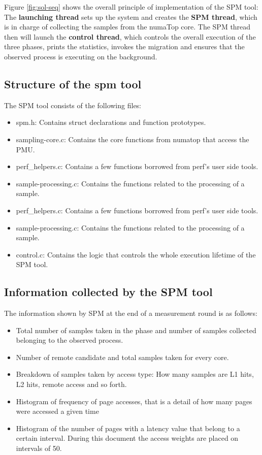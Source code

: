 Figure \ref{fig:sol-seq} shows the overall principle of implementation of the SPM tool: The \textbf{launching thread} sets up the system and creates the \textbf{SPM thread}, which is in charge of collecting the samples from the numaTop core. The SPM thread then will launch the \textbf{control thread}, which controls the overall execution of the three phases, prints the statistics, invokes the migration and ensures that the observed process is executing on the background.

\subsection{Structure of the spm tool}\label{subsection:spmstructr}

The SPM tool consists of the following files:
\begin{itemize}
	\item spm.h: Contains struct declarations and function prototypes.
	\item sampling-core.c: Contains the core functions from numatop that access the PMU.
		\item perf\_helpers.c: Contains a few functions borrowed from perf's user side tools.
	\item sample-processing.c: Contains the functions related to the processing of a sample.
	\item perf\_helpers.c: Contains a few functions borrowed from perf's user side tools.
	\item sample-processing.c: Contains the functions related to the processing of a sample.
	\item control.c: Contains the logic that controls the whole execution lifetime of the SPM tool.
\end{itemize}

\subsection{Information collected by the SPM tool}\label{subsection:spminf}

The information shown by SPM at the end of a measurement round is as follows:
\begin{itemize}
	\item Total number of samples taken in the phase and number of samples collected belonging to the observed process.
	\item Number of remote candidate and total samples taken for every core.
	\item Breakdown of samples taken by access type: How many samples are L1 hits, L2 hits, remote access and so forth.
	\item Histogram of frequency of page accesses, that is a detail of how many pages were accessed a given time
	\item Histogram of the number of pages with a latency value that belong to a certain interval. During this document the access weights are placed on intervals of 50.
\end{itemize}

